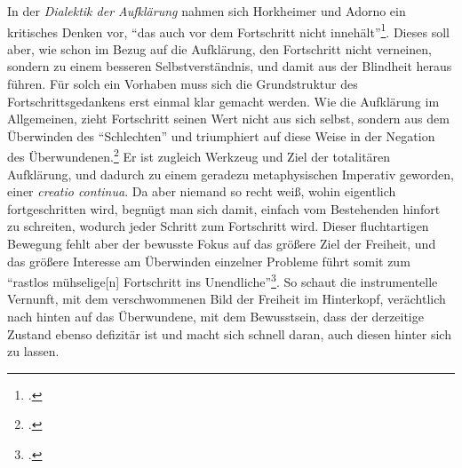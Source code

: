\documentclass[a4paper, 12pt]{article}
\begin{document}
\begin{onehalfspace}
In der \emph{Dialektik der Aufklärung} nahmen sich Horkheimer und Adorno ein kritisches Denken vor, "`das auch vor dem Fortschritt nicht innehält"'\footnote{\Cite[Siehe][S. IX ("`Zur Neuausgabe"')]{dialektik-der-aufklaerung}.}. Dieses soll aber, wie schon im Bezug auf die Aufklärung, den Fortschritt nicht verneinen, sondern zu einem besseren Selbstverständnis, und damit aus der Blindheit heraus führen. Für solch ein Vorhaben muss sich die Grundstruktur des Fortschrittsgedankens erst einmal klar gemacht werden. Wie die Aufklärung im Allgemeinen, zieht Fortschritt seinen Wert nicht aus sich selbst, sondern aus dem Überwinden des "`Schlechten"' und triumphiert auf diese Weise in der Negation des Überwundenen.\footnote{\Cite[Vgl.][S. 638]{fortschritt}.} Er ist zugleich Werkzeug und Ziel der totalitären Aufklärung, und dadurch zu einem geradezu metaphysischen Imperativ geworden, einer \emph{creatio continua}. Da aber niemand so recht weiß, wohin eigentlich fortgeschritten wird, begnügt man sich damit, einfach vom Bestehenden hinfort zu schreiten, wodurch jeder Schritt zum Fortschritt wird. Dieser fluchtartigen Bewegung fehlt aber der bewusste Fokus auf das größere Ziel der Freiheit, und das größere Interesse am Überwinden einzelner Probleme führt somit zum "`rastlos mühselige[n] Fortschritt ins Unendliche"'\footnote{\Cite[Siehe][S. 32]{dialektik-der-aufklaerung}.}. So schaut die instrumentelle Vernunft, mit dem verschwommenen Bild der Freiheit im Hinterkopf, verächtlich nach hinten auf das Überwundene, mit dem Bewusstsein, dass der derzeitige Zustand ebenso defizitär ist und macht sich schnell daran, auch diesen hinter sich zu lassen. 


\end{onehalfspace}
\end{document}
